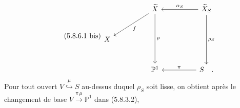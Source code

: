 \begin{equation}\tag{5.8.6.1 bis}
\begin{tikzcd}[column sep=huge, row sep=large]
 {} & \widetilde{X} \arrow[dl, "f"] \arrow[dd, "\rho"] & \widetilde{X}_S \arrow[l, "\alpha_S"'] \arrow[dd, "\rho_S"] \\
X & {} & {} \\
 {} & \mathbb{P}^1 & S \arrow[l, "\pi"'] \quad .
\end{tikzcd}
\end{equation}
Pour tout ouvert $V \overset{\mu}{\hookrightarrow} S$ au-dessus duquel $\rho_S$ soit lisse, on obtient après le changement de base $V \overset{\pi\,\mu}{\longrightarrow} \mathbb{P}^1$ dans (5.8.3.2), 

